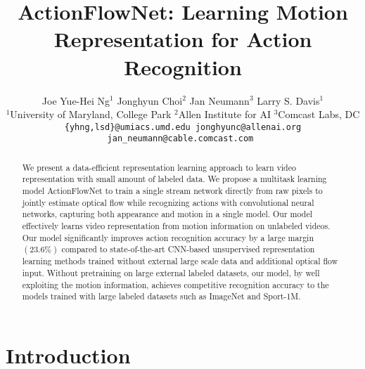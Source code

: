 \documentclass[10pt,twocolumn,letterpaper]{article}
\begin{document}
\title{ActionFlowNet: Learning Motion Representation for Action Recognition}
\author{
  Joe Yue-Hei Ng$^1$ \hspace{1em}
  Jonghyun Choi$^2$ \hspace{1em}
  Jan Neumann$^3$ \hspace{1em}
  Larry S. Davis$^1$ \vspace{.3em}
  \\
  $^1$University of Maryland, College Park \hspace{1.5em}
  $^2$Allen Institute for AI \hspace{1.5em}
  $^3$Comcast Labs, DC \vspace{.3em}\\
{\tt\small \{yhng,lsd\}@umiacs.umd.edu \hspace{1em}
jonghyunc@allenai.org \hspace{1em}
jan\_neumann@cable.comcast.com }
}

\maketitle
\ifwacvfinal\thispagestyle{empty}\fi

\begin{abstract}


We present a data-efficient representation learning approach to learn video representation with small amount of labeled data.
We propose a multitask learning model ActionFlowNet to train a single stream network directly from raw pixels to jointly estimate optical flow while recognizing actions with convolutional neural networks, capturing both appearance and motion in a single model.
Our model effectively learns video representation from motion information on unlabeled videos.
Our model significantly improves action recognition accuracy by a large margin $(23.6\%)$ compared to state-of-the-art CNN-based unsupervised representation learning methods trained without external large scale data and additional optical flow input.
Without pretraining on large external labeled datasets, our model, by well exploiting the motion information, achieves competitive recognition accuracy to the models trained with large labeled datasets such as ImageNet and Sport-1M.


 \end{abstract}




\section{Introduction}
\label{sec:intro}
\end{document}
